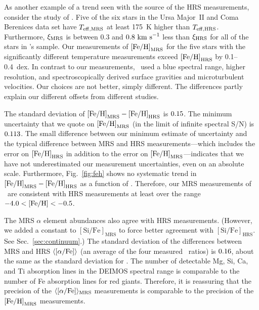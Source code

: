 \documentclass{emulateapj}
\begin{document}
As another example of a trend seen with the source of the HRS
measurements, consider the study of \citet{fre10b}.  Five of the six
stars in the Ursa Major~II and Coma Berenices data set have $T_{\rm
  eff,MRS}$ at least 175~K higher than $T_{\rm eff,HRS}$.
Furthermore, $\xi_{\rm MRS}$ is between 0.3 and $0.8~{\rm km~s}^{-1}$
less than $\xi_{\rm HRS}$ for all of the stars in
\citeauthor{fre10b}'s sample.  Our measurements of ${\rm [Fe/H]}_{\rm
  MRS}$ for the five stars with the significantly different
temperature measurements exceed ${\rm [Fe/H]}_{\rm HRS}$ by 0.1--0.4~dex.
In contrast to our measurements, \citeauthor{fre10b}\ used a blue
spectral range, higher resolution, and spectroscopically derived
surface gravities and microturbulent velocities.  Our choices are not
better, simply different.  The differences partly explain our
different offsets from different studies.

The standard deviation of ${\rm [Fe/H]}_{\rm MRS} - {\rm [Fe/H]}_{\rm HRS}$ is
$0.15$.  The minimum uncertainty that we quote on
${\rm [Fe/H]}_{\rm MRS}$ (in the limit of infinite spectral S/N) is
$0.113$.  The small difference between our minimum estimate of
uncertainty and the typical difference between MRS and HRS
measurements---which includes the error on ${\rm [Fe/H]}_{\rm HRS}$ in
addition to the error on ${\rm [Fe/H]}_{\rm MRS}$---indicates that we have
not underestimated our measurement uncertainties, even on an absolute
scale.  Furthermore, Fig.~\ref{fig:feh} shows no systematic trend in
${\rm [Fe/H]}_{\rm MRS} - {\rm [Fe/H]}_{\rm HRS}$ as a function of \feh.
Therefore, our MRS measurements of \feh\ are consistent with HRS
measurements at least over the range $-4.0 < {\rm [Fe/H]} < -0.5$.

The MRS $\alpha$ element abundances also agree with HRS measurements.
(However, we added a constant to $\mathrm{[Si/Fe]}_{\mathrm{MRS}}$ to
force better agreement with $\mathrm{[Si/Fe]}_{\mathrm{HRS}}$.  See
Sec.~\ref{sec:continuum}.)  The standard deviation of the differences
between MRS and HRS $\langle[\alpha/\rm{Fe}]\rangle$ (an average of
the four measured \xfe\ ratios) is $0.16$, about the
same as the standard deviation for \feh.  The number of detectable Mg,
Si, Ca, and Ti absorption lines in the DEIMOS spectral range is
comparable to the number of Fe absorption lines for red giants.
Therefore, it is reassuring that the precision of the
$\langle{\rm [\alpha/Fe]}\rangle_{\rm MRS}$ measurements is comparable to the
precision of the ${\rm [Fe/H]}_{\rm MRS}$ measurements.
\end{document}

